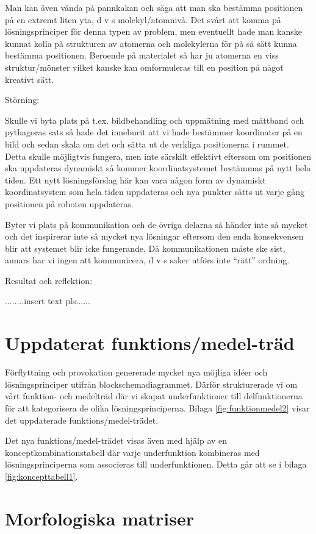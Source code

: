 \documentclass[11pt, a4paper]{report}
\begin{document}
Man kan även vända på pannkakan och säga att man ska bestämma positionen på en extremt liten yta, d v s molekyl/atomnivå. Det svårt att komma på lösningsprinciper för denna typen av problem, men eventuellt hade man kanske kunnat kolla på strukturen av atomerna och molekylerna för på så sätt kunna bestämma positionen. Beroende på materialet så har ju atomerna en viss struktur/mönster vilket kanske kan omformuleras till en position på något kreativt sätt.


Störning:

Skulle vi byta plats på t.ex. bildbehandling och uppmätning med måttband och pythagoras sats så hade det inneburit att vi hade bestämmer koordinater på en bild och sedan skala om det och sätta ut de verkliga positionerna i rummet. Detta skulle möjligtvis fungera, men inte särskilt effektivt eftersom om positionen ska uppdateras dynamiskt så kommer koordinatsystemet bestämmas på nytt hela tiden. Ett nytt lösningsförslag här kan vara någon form av dynamiskt koordinatsystem som hela tiden uppdateras och nya punkter sätts ut varje gång positionen på roboten uppdateras.

Byter vi plats på kommunikation och de övriga delarna så händer inte så mycket och det inspirerar inte så mycket nya lösningar eftersom den enda konsekvensen blir att systemet blir icke fungerande. Då kommunikationen måste ske sist, annars har vi ingen att kommunicera, d v s saker utförs inte “rätt” ordning.

Resultat och reflektion:


........insert text pls......


\section{Uppdaterat funktions/medel-träd}

Förflyttning och provokation genererade mycket nya möjliga idéer och lösningsprinciper utifrån blockschemadiagrammet. Därför strukturerade vi om vårt funktion- och medelträd där vi skapat underfunktioner till delfunktionerna för att kategorisera de olika lösningsprinciperna. Bilaga \ref{fig:funktionmedel2} visar det uppdaterade funktions/medel-trädet.

Det nya funktions/medel-trädet visas även med hjälp av en konceptkombinationstabell där varje underfunktion kombineras med lösningsprinciperna som associeras till underfunktionen. Detta går att se i bilaga \ref{fig:koncepttabell1}.


\section{Morfologiska matriser}
\end{document}
